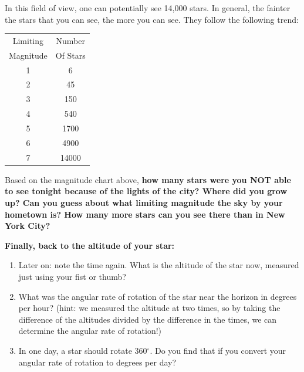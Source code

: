 \documentclass[11pt]{article}
\begin{document}
\medskip \noindent
In this field of view, one can potentially see 14,000 stars. In general, the fainter the stars that you can see, the more you can see.  They follow the following trend:

\begin{center}
\begin{tabular}{|c|c|}
\hline
Limiting & Number\\
Magnitude & Of Stars\\
\hline
1 & 6\\
2 & 45\\
3 & 150\\
4 & 540\\
5 & 1700 \\
6 & 4900\\
7 & 14000\\
\hline
\end{tabular}
\end{center}

\noindent
Based on the magnitude chart above, \textbf{how many stars were you NOT able to see tonight because of the lights of the city?  Where did you grow up?  Can you guess about what limiting magnitude the sky by your hometown is?  How many more stars can you see there than in New York City?}

\medskip \noindent
\textbf{Finally, back to the altitude of your star:}

\begin{enumerate}[resume]
    \item Later on: note the time again. What is the altitude of the star now, measured just using your fist or thumb?
    \item What was the angular rate of rotation of the star near the horizon in degrees per hour? (hint: we measured the altitude at two times, so by taking the difference of the altitudes divided by the difference in the times, we can determine the angular rate of rotation!)
    \item In one day, a star should rotate 360$^{\circ}$. Do you find that if you convert your angular rate of rotation to degrees per day?
\end{enumerate}
\end{document}
